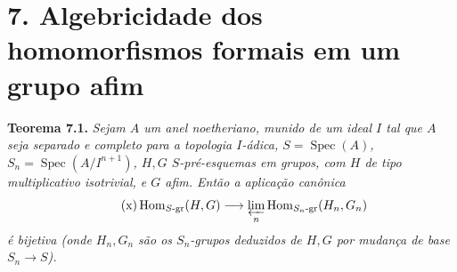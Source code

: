
\section*{7. Algebricidade dos homomorfismos formais em um grupo afim}

\medskip
\noindent{}\textbf{Teorema 7.1.}
\textit{Sejam \(A\) um anel noetheriano, munido de um ideal
\(I\) tal que \(A\) seja separado e completo para a
topologia \(I\)-ádica, \(S=\operatorname{Spec}(A)\),
\(S_n=\operatorname{Spec}(A/I^{n+1})\), \(H,G\)
\(S\)-pré-esquemas em grupos, com \(H\) de tipo
multiplicativo isotrivial, e \(G\) afim. Então a aplicação
canônica
\begin{equation}
  \tag{x}
  \operatorname{Hom}_{S\text{-}\mathrm{gr}}(H,G)
  \longrightarrow
  \varprojlim_n
  \operatorname{Hom}_{S_n\text{-}\mathrm{gr}}(H_n,G_n)
\end{equation}
é bijetiva (onde \(H_n,G_n\) são os \(S_n\)-grupos
deduzidos de \(H,G\) por mudança de base \(S_n\to S\)).}

